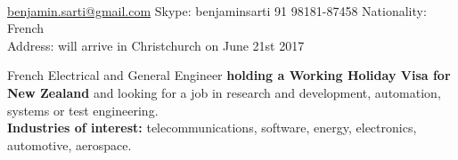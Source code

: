 \documentclass[12pt,a4paper]{article} %
\begin{document}
 



\\
\begin{small}
\noindent\href{mailto:benjamin.sarti@gmail.com}{benjamin.sarti@gmail.com} \bull Skype: benjaminsarti \bull %
\textsmaller{+}91 98181-87458 \bull Nationality: French\\ %
Address: will arrive in Christchurch on June 21st 2017 %
\end{small}


\spacedhrule{0.9em}{-0.4em} %




French Electrical and General Engineer \textbf{holding a Working Holiday Visa for New Zealand} and looking for a job in research and development, automation, systems or test engineering. \\
\textbf{Industries of interest:} telecommunications, software, energy, electronics, automotive, aerospace.
\end{document}
